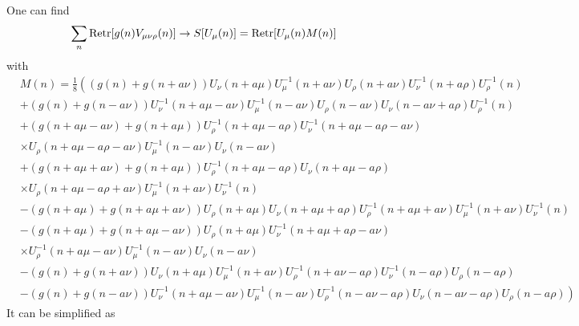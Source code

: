 One can find
\begin{equation}
\begin{split}
&\sum _n{\rm Retr}[g(n)V_{\mu\nu\rho}(n)]\to S[U_{\mu}(n)]={\rm Retr}[U_{\mu}(n)M(n)]
\end{split}
\end{equation}
with
\begin{equation}
\begin{split}
&M(n)=\frac{1}{8}\left((g(n)+g(n+a\nu))U_{\nu}(n+a\mu)U_{\mu}^{-1}(n+a\nu)U_{\rho}(n+a\nu)U_{\nu}^{-1}(n+a\rho)U_{\rho}^{-1}(n)\right.\\
&\left.+(g(n)+g(n-a\nu))U^{-1}_{\nu}(n+a\mu-a\nu)U_{\mu}^{-1}(n-a\nu)U_{\rho}(n-a\nu)U_{\nu}(n-a\nu+a\rho)U_{\rho}^{-1}(n)\right.\\
&\left.+(g(n+a\mu-a\nu)+g(n+a\mu))U^{-1}_{\rho}(n+a\mu-a\rho)U_{\nu}^{-1}(n+a\mu-a\rho-a\nu)\right.\\
&\left.\times U_{\rho}(n+a\mu-a\rho-a\nu)U^{-1}_{\mu}(n-a\nu)U_{\nu}(n-a\nu)\right.\\
&\left.+(g(n+a\mu+a\nu)+g(n+a\mu))U^{-1}_{\rho}(n+a\mu-a\rho)U_{\nu}(n+a\mu-a\rho)\right.\\
&\left.\times U_{\rho}(n+a\mu-a\rho+a\nu)U_{\mu}^{-1}(n+a\nu)U_{\nu}^{-1}(n)\right.\\
&\left.-(g(n+a\mu)+g(n+a\mu+a\nu))U_{\rho}(n+a\mu)U_{\nu}(n+a\mu+a\rho)U_{\rho}^{-1}(n+a\mu+a\nu)U_{\mu}^{-1}(n+a\nu)U_{\nu}^{-1}(n)\right.\\
&\left.-(g(n+a\mu)+g(n+a\mu-a\nu))U_{\rho}(n+a\mu)U_{\nu}^{-1}(n+a\mu+a\rho-a\nu)\right.\\
&\left.\times U_{\rho}^{-1}(n+a\mu-a\nu)U_{\mu}^{-1}(n-a\nu)U_{\nu}(n-a\nu)\right.\\
&\left.-(g(n)+g(n+a\nu))U_{\nu}(n+a\mu)U_{\mu}^{-1}(n+a\nu)U_{\rho}^{-1}(n+a\nu-a\rho)U_{\nu}^{-1}(n-a\rho)U_{\rho}(n-a\rho)\right.\\
&\left.-(g(n)+g(n-a\nu))U_{\nu}^{-1}(n+a\mu-a\nu)U_{\mu}^{-1}(n-a\nu)U_{\rho}^{-1}(n-a\nu-a\rho)U_{\nu}(n-a\nu-a\rho)U_{\rho}(n-a\rho)\right)
\end{split}
\end{equation}
It can be simplified as
